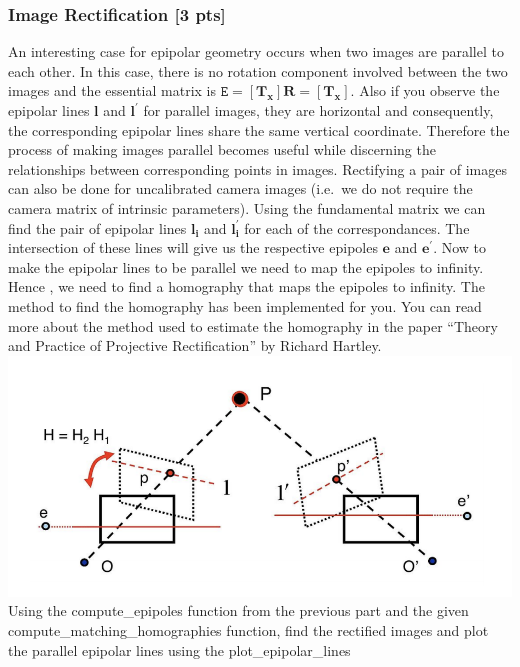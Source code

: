 \documentclass[11pt]{article}
\makeatletter
\def\maxwidth{\ifdim\Gin@nat@width>\linewidth\linewidth
    \else\Gin@nat@width\fi}
\let\Oldincludegraphics\includegraphics
\renewcommand{\includegraphics}[1]{\Oldincludegraphics[width=.8\maxwidth]{#1}}
\makeatother
\begin{document}
    \hypertarget{image-rectification-3-pts}{%
\subsubsection{Image Rectification {[}3
pts{]}}\label{image-rectification-3-pts}}

An interesting case for epipolar geometry occurs when two images are
parallel to each other. In this case, there is no rotation component
involved between the two images and the essential matrix is
\(\texttt{E}=[\boldsymbol{T_{x}}]\boldsymbol{R}=[\boldsymbol{T_{x}}]\).
Also if you observe the epipolar lines \(\boldsymbol{l}\) and
\(\boldsymbol{l^{'}}\) for parallel images, they are horizontal and
consequently, the corresponding epipolar lines share the same vertical
coordinate. Therefore the process of making images parallel becomes
useful while discerning the relationships between corresponding points
in images. Rectifying a pair of images can also be done for uncalibrated
camera images (i.e.~we do not require the camera matrix of intrinsic
parameters). Using the fundamental matrix we can find the pair of
epipolar lines \(\boldsymbol{l_i}\) and \(\boldsymbol{l^{'}_i}\) for
each of the correspondances. The intersection of these lines will give
us the respective epipoles \(\boldsymbol{e}\) and
\(\boldsymbol{e^{'}}\). Now to make the epipolar lines to be parallel we
need to map the epipoles to infinity. Hence , we need to find a
homography that maps the epipoles to infinity. The method to find the
homography has been implemented for you. You can read more about the
method used to estimate the homography in the paper ``Theory and
Practice of Projective Rectification'' by Richard Hartley.
\includegraphics{image_rectification.png} Using the compute\_epipoles
function from the previous part and the given
compute\_matching\_homographies function, find the rectified images and
plot the parallel epipolar lines using the plot\_epipolar\_lines
\end{document}
